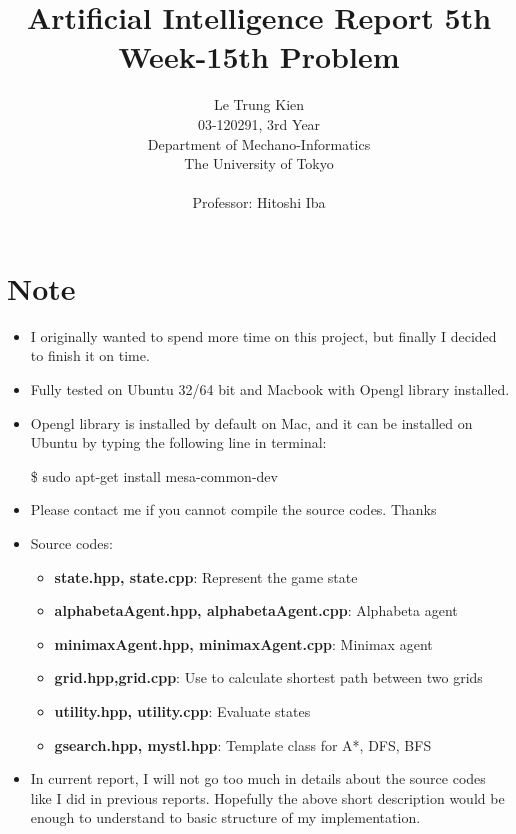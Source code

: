 \documentclass[a4paper, 11pt]{article}
\begin{document}
\title{Artificial Intelligence Report 5th Week-15th Problem}
\author{Le Trung Kien\\ 
  03-120291, 3rd Year \\
  Department of Mechano-Informatics \\ 
  The University of Tokyo \\ \\
  Professor: Hitoshi Iba
}
\maketitle

\section*{Note}
\begin{itemize}
\item I originally wanted to spend more time on this project, but finally I decided to finish it on time. 
\item Fully tested on Ubuntu 32/64 bit and Macbook with Opengl library installed.
\item Opengl library is installed by default on Mac, and it can be installed on Ubuntu by typing the following line in terminal: 
  \begin{center} \$ sudo apt-get install mesa-common-dev \end{center}
\item Please contact me if you cannot compile the source codes. Thanks
\item Source codes: 

  \begin{itemize}
  \item \textbf{state.hpp, state.cpp}: Represent the game state 
  \item \textbf{alphabetaAgent.hpp, alphabetaAgent.cpp}: Alphabeta agent 
  \item \textbf{minimaxAgent.hpp, minimaxAgent.cpp}: Minimax agent 
  \item \textbf{grid.hpp,grid.cpp}: Use to calculate shortest path between two grids
  \item \textbf{utility.hpp, utility.cpp}: Evaluate states
  \item \textbf{gsearch.hpp, mystl.hpp}: Template class for A*, DFS, BFS
  \end{itemize}
\item In current report, I will not go too much in details about the source codes like I did in previous reports. Hopefully the above short description would be enough to understand to basic structure of my implementation.
\end{itemize}
\end{document}
